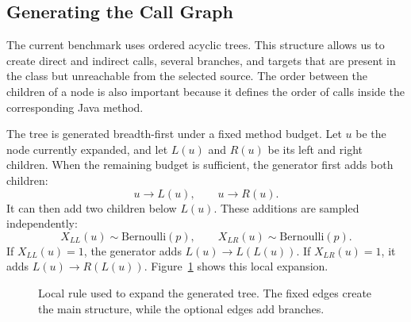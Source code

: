 \subsection{Generating the Call Graph}

The current benchmark uses ordered acyclic trees. This structure allows us to create direct and indirect calls, several branches, and targets that are present in the class but unreachable from the selected source. The order between the children of a node is also important because it defines the order of calls inside the corresponding Java method.

The tree is generated breadth-first under a fixed method budget. Let $u$ be the node currently expanded, and let $L(u)$ and $R(u)$ be its left and right children. When the remaining budget is sufficient, the generator first adds both children:
\[
    u \rightarrow L(u), \qquad u \rightarrow R(u).
\]
It can then add two children below $L(u)$. These additions are sampled independently:
\[
    X_{LL}(u) \sim \mathrm{Bernoulli}(p),
    \qquad
    X_{LR}(u) \sim \mathrm{Bernoulli}(p).
\]
If $X_{LL}(u)=1$, the generator adds $L(u) \rightarrow L(L(u))$. If $X_{LR}(u)=1$, it adds $L(u) \rightarrow R(L(u))$. Figure~\ref{fig:local-tree-rule} shows this local expansion.

\begin{figure}[t]
\centering
{}
\caption{Local rule used to expand the generated tree. The fixed edges create the main structure, while the optional edges add branches.}
\label{fig:local-tree-rule}
\end{figure}


